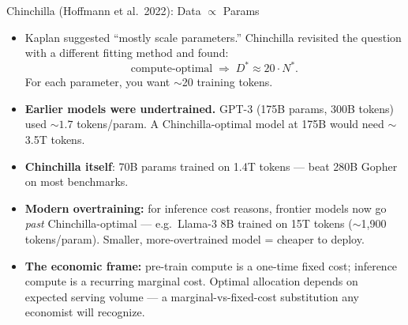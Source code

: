 \begin{frame}{Chinchilla (Hoffmann et al.\ 2022): Data $\propto$ Params}
\begin{itemize}
\item Kaplan suggested ``mostly scale parameters.'' Chinchilla revisited the question with a different fitting method and found:
\[
   \text{compute-optimal} \;\Longrightarrow\; D^* \approx 20 \cdot N^*.
\]
For each parameter, you want $\sim$20 training tokens.

\medskip
\item \textbf{Earlier models were undertrained.} GPT-3 (175B params, 300B tokens) used $\sim$$1.7$ tokens/param. A Chinchilla-optimal model at 175B would need $\sim$3.5T tokens.

\medskip
\item \textbf{Chinchilla itself}: 70B params trained on 1.4T tokens --- beat 280B Gopher on most benchmarks.

\medskip
\item \textbf{Modern overtraining:} for inference cost reasons, frontier models now go \emph{past} Chinchilla-optimal --- e.g.\ Llama-3 8B trained on 15T tokens ($\sim$1{,}900 tokens/param). Smaller, more-overtrained model = cheaper to deploy.

\medskip
\item \textbf{The economic frame:} pre-train compute is a one-time fixed cost; inference compute is a recurring marginal cost. Optimal allocation depends on expected serving volume --- a marginal-vs-fixed-cost substitution any economist will recognize.
\end{itemize}
\end{frame}

